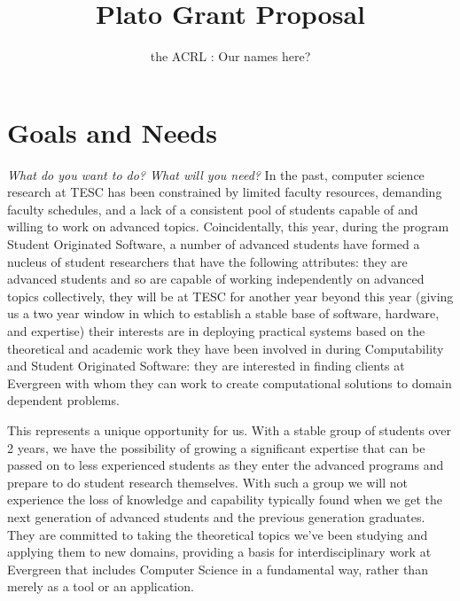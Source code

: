 \documentclass{article}
\begin{document}
\title{Plato Grant Proposal}
\author{the ACRL : Our names here?}
\maketitle

\tableofcontents
\newpage 
\section{Goals and Needs}
\textit{What do you want to do?  What will you need?}
\linebreak 
\linebreak 
In the past, computer science research at TESC has been constrained by limited faculty
resources, demanding faculty schedules, and a lack of a consistent pool of students capable
of and willing to work on advanced topics. Coincidentally, this year, during the program
Student Originated Software, a number of advanced students have formed a nucleus of
student researchers that have the following attributes:
\linebreak 
they are advanced students and so are capable of working independently on
advanced topics
\linebreak 
collectively, they will be at TESC for another year beyond this year (giving us a two
year window in which to establish a stable base of software, hardware, and
expertise)
\linebreak 
their interests are in deploying practical systems based on the theoretical and
academic work they have been involved in during Computability and Student
Originated Software: they are interested in finding clients at Evergreen with whom
they can work to create computational solutions to domain dependent problems.
\linebreak 
\linebreak 

This represents a unique opportunity for us. With a stable group of students over 2 years,
we have the possibility of growing a significant expertise that can be passed on to less
experienced students as they enter the advanced programs and prepare to do student
research themselves. With such a group we will not experience the loss of knowledge and
capability typically found when we get the next generation of advanced students and the
previous generation graduates. They are committed to taking the theoretical topics we've
been studying and applying them to new domains, providing a basis for interdisciplinary
work at Evergreen that includes Computer Science in a fundamental way, rather than
merely as a tool or an application.
\linebreak
\linebreak
\end{document}
